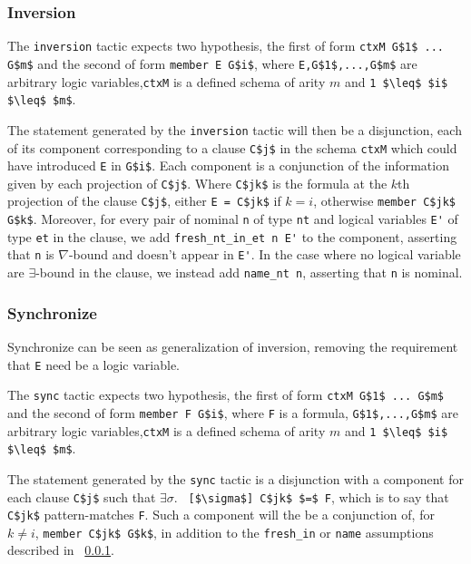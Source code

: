 \documentclass[nocopyrightspace,authoryear]{sigplanconf}
\begin{document}
\subsubsection{Inversion}
\label{subsec:inv}

The \lstinline|inversion| tactic expects two hypothesis, the first of form \lstinline|ctxM G$1$ ... G$m$| and the second of form \lstinline|member E G$i$|, where \lstinline|E,G$1$,...,G$m$| are arbitrary logic variables,\lstinline|ctxM| is a defined schema of arity $m$ and \lstinline|1 $\leq$ $i$ $\leq$ $m$|.

The statement generated by the \lstinline|inversion| tactic will then be a disjunction, each of its component corresponding to a clause \lstinline|C$j$| in the schema \lstinline|ctxM| which could have introduced \lstinline|E| in \lstinline|G$i$|. Each component is a conjunction of the information given by each projection of \lstinline|C$j$|. Where \lstinline|C$jk$| is the formula at the $k$th projection of the clause \lstinline|C$j$|, either \lstinline|E = C$jk$| if $k=i$, otherwise \lstinline|member C$jk$ G$k$|. Moreover, for every pair of nominal \lstinline|n| of type \lstinline|nt| and logical variables \lstinline|E'| of type \lstinline|et| in the clause, we add \lstinline|fresh_nt_in_et n E'| to the component, asserting that \lstinline|n| is $\nabla$-bound and doesn't appear in \lstinline|E'|. In the case where no logical variable are $\exists$-bound in the clause, we instead add \lstinline|name_nt n|, asserting that \lstinline|n| is nominal.

\subsubsection{Synchronize}
Synchronize can be seen as generalization of inversion, removing the requirement that \lstinline|E| need be a logic variable. 

The \lstinline|sync| tactic expects two hypothesis, the first of form \lstinline|ctxM G$1$ ... G$m$| and the second of form \lstinline|member F G$i$|, where \lstinline|F| is a formula, \lstinline|G$1$,...,G$m$| are arbitrary logic variables,\lstinline|ctxM| is a defined schema of arity $m$ and \lstinline|1 $\leq$ $i$ $\leq$ $m$|.

The statement generated by the \lstinline|sync| tactic is a disjunction with a component for each clause \lstinline|C$j$| such that $\exists \sigma.$ \lstinline| [$\sigma$] C$jk$ $=$ F|, which is to say that \lstinline|C$jk$| pattern-matches \lstinline|F|. Such a component will the be a conjunction of, for $k \neq i$, \lstinline|member C$jk$ G$k$|, in addition to the \lstinline|fresh_in| or \lstinline|name| assumptions described in ~\ref{subsec:inv}.
\end{document}
